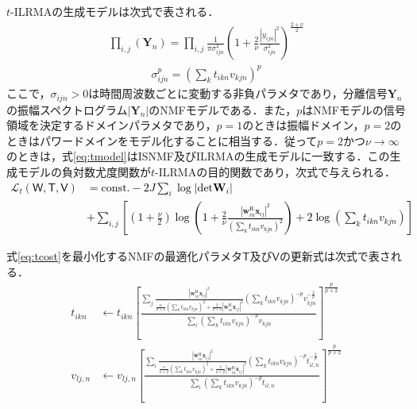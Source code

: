 $t$-ILRMAの生成モデルは次式で表される．
\begin{align}
     \prod_{i,j}\left(\bm{Y}_{n}\right)= \prod_{i,j}\frac{1}{\pi \sigma_{ijn}^{2} } \left( 1+\frac{2}{\nu}\frac{|y_{ijn}|^2}{\sigma_{ijn}^{2}} \right)^{\frac{2+\nu}{2}}　\label{eq:tmodel}
\end{align}
\begin{align}
     \sigma_{ijn}^{p}=\left(\sum_{k}t_{ikn}v_{kjn}\right)^{p} \label{eq:tsigma}
\end{align}
ここで，$\sigma_{ijn}>0$は時間周波数ごとに変動する非負パラメタであり，分離信号$\bm{Y}_{n}$の振幅スペクトログラム$|\bm{Y}_{n}|$のNMFモデルである．また，$p$はNMFモデルの信号領域を決定するドメインパラメタであり，$p=1$のときは振幅ドメイン，$p=2$のときはパワードメインをモデル化することに相当する．従って$p=2$かつ$\nu\rightarrow\infty$のときは，式\eqref{eq:tmodel}はISNMF及びILRMAの生成モデルに一致する．この生成モデルの負対数尤度関数が$t$-ILRMAの目的関数であり，次式で与えられる．
\textcolor{black}{
\begin{align}
    \nonumber \mathcal{L}_{t}(\mathsf{W, T, V}) &= \mathrm{const.}-2J \sum_{i}\log|\mathrm{det}\bm{W}_{i}| \\
&+ \sum_{i,j}\left\lbrack\left(1+\frac{\nu}{2}\right)\log\left(1+\frac{2}{\nu}\frac{|\bm{w}_{in}^{\mathrm{H}}\bm{x}_{ij}|^2}{\left(\sum_{k}t_{ikn}v_{kjn}\right)^2}\right)+2\log\left(\sum_{k}t_{ikn}v_{kjn}\right)\right\rbrack \label{eq:tcost}
\end{align}}

式\eqref{eq:tcost}を最小化するNMFの最適化パラメタ$\mathsf{T}$及び$\mathsf{V}$の更新式は次式で表される．
\begin{align}
    t_{ikn}&\leftarrow t_{ikn}\left\lbrack\frac{\sum_{j}\frac{|\bm{w}_{in}^{\mathrm{H}}\bm{x}_{ij}|^2}{\frac{\nu}{\nu+2}\left(\sum_{k}t_{ikn}v_{kjn}\right)^{2}+\frac{2}{\nu+2}|\bm{w}_{in}^{\mathrm{H}}\bm{x}_{ij}|^2}\left(\sum_{k}t_{ikn}v_{kjn}\right)^{-p}v_{kjn}^{-\frac{2}{p}}}{\sum_{i}\left(\sum_{k}t_{ikn}v_{kjn}\right)^{-p}v_{kjn}}\right\rbrack^{\frac{p}{p+2}} \label{eq:tt} \\
    v_{lj,n}&\leftarrow v_{lj,n}\left\lbrack\frac{\sum_{i}\frac{|\bm{w}_{in}^{\mathrm{H}}\bm{x}_{ij}|^2}{\frac{\nu}{\nu+2}\left(\sum_{k}t_{ikn}v_{kjn}\right)^{2}+\frac{2}{\nu+2}|\bm{w}_{in}^{\mathrm{H}}\bm{x}_{ij}|^2}\left(\sum_{k}t_{ikn}v_{kjn}\right)^{-p}t_{il,n}^{-\frac{2}{p}}}{\sum_{i}\left(\sum_{k}t_{ikn}v_{kjn}\right)^{-p}t_{il,n}}\right\rbrack^{\frac{p}{p+2}} \label{eq:tv}
\end{align}

